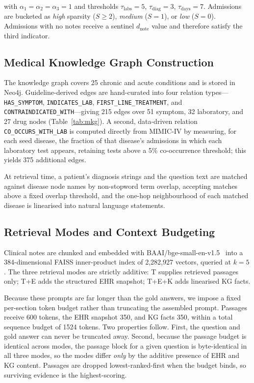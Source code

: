 \documentclass[preprint,12pt]{elsarticle}
\begin{document}
with $\alpha_1 = \alpha_2 = \alpha_3 = 1$ and thresholds
$\tau_{\text{labs}} = 5$, $\tau_{\text{diag}} = 3$,
$\tau_{\text{days}} = 7$. Admissions are bucketed as \textit{high}
sparsity ($S \geq 2$), \textit{medium} ($S = 1$), or \textit{low}
($S = 0$). Admissions with no notes receive a sentinel
$d_{\text{note}}$ value and therefore satisfy the third indicator.

\subsection{Medical Knowledge Graph Construction}
\label{sec:mkg}

The knowledge graph covers 25 chronic and acute conditions and is
stored in Neo4j. Guideline-derived edges are hand-curated into four
relation types---\texttt{HAS\_SYMPTOM}, \texttt{INDICATES\_LAB},
\texttt{FIRST\_LINE\_TREATMENT}, and
\texttt{CONTRAINDICATED\_WITH}---giving 215 edges over 51 symptom, 32
laboratory, and 27 drug nodes (Table~\ref{tab:mkg}). A second,
data-driven relation \texttt{CO\_OCCURS\_WITH\_LAB} is computed
directly from MIMIC-IV by measuring, for each seed disease, the
fraction of that disease's admissions in which each laboratory test
appears, retaining tests above a 5\% co-occurrence threshold; this
yields 375 additional edges.

At retrieval time, a patient's diagnosis strings and the question text
are matched against disease node names by non-stopword term overlap,
accepting matches above a fixed overlap threshold, and the one-hop
neighbourhood of each matched disease is linearised into natural
language statements.

\subsection{Retrieval Modes and Context Budgeting}

Clinical notes are chunked and embedded with
BAAI/bge-small-en-v1.5~\cite{bge2024} into a 384-dimensional FAISS
inner-product index of 2{,}282{,}927 vectors, queried at $k = 5$. The
three retrieval modes are strictly additive: T supplies retrieved
passages only; T+E adds the structured EHR snapshot; T+E+K adds
linearised KG facts.

Because these prompts are far longer than the gold answers, we impose
a fixed per-section token budget rather than truncating the assembled
prompt. Passages receive 600 tokens, the EHR snapshot 350, and KG
facts 350, within a total sequence budget of 1524 tokens. Two
properties follow. First, the question and gold answer can never be
truncated away. Second, because the passage budget is identical across
modes, the passage block for a given question is byte-identical in all
three modes, so the modes differ \textit{only} by the additive presence
of EHR and KG content. Passages are dropped lowest-ranked-first when
the budget binds, so surviving evidence is the highest-scoring.
\end{document}
